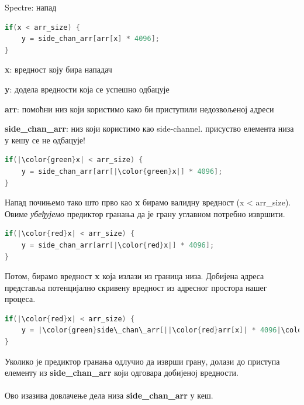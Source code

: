 \documentclass[xcolor=table]{beamer}
\begin{document}
    \begin{frame}{Spectre: напад}
        \begin{lstlisting}[language=java,frame=single]
if(x < arr_size) {
    y = side_chan_arr[arr[x] * 4096];
}
        \end{lstlisting}
        
        \textbf{x}: вредност коју бира нападач
        
        \textbf{y}: додела вредности која се успешно одбацује
        
        \textbf{arr}: помоћни низ који користимо како би приступили недозвољеној адреси
        
        \textbf{side\_chan\_arr}: низ који користимо као side-channel. присуство елемента низа у кешу се не одбацује!
        
        \framebreak
        \begin{lstlisting}[language=java,frame=single]
if(|\color{green}x| < arr_size) {
    y = side_chan_arr[arr[|\color{green}x|] * 4096];
}
        \end{lstlisting}
        
        Напад почињемо тако што прво као \textbf{x} бирамо валидну вредност (x < arr\_size).
        Овиме \textit{убеђујемо} предиктор гранања да је грану углавном потребно извршити.
        
        \framebreak
        \begin{lstlisting}[language=java,frame=single]
if(|\color{red}x| < arr_size) {
    y = side_chan_arr[arr[|\color{red}x|] * 4096];
}
        \end{lstlisting}
        
        Потом, бирамо вредност \textbf{x} која излази из граница низа.
        Добијена адреса представља потенцијално скривену вредност из адресног простора нашег процеса.
        
        \framebreak
        \begin{lstlisting}[language=java,frame=single]
if(|\color{red}x| < arr_size) {
    y = |\color{green}side\_chan\_arr[||\color{red}arr[x]| * 4096|\color{green}]|;
}
        \end{lstlisting}
        
        Уколико је предиктор гранања одлучио да изврши грану, долази до приступа елементу из \textbf{side\_chan\_arr} који одговара добијеној вредности.
        \\~\\
        Ово изазива довлачење дела низа \textbf{side\_chan\_arr} у кеш.
        

\end{frame}
\end{document}
